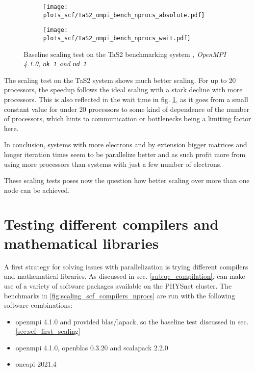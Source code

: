 \documentclass[main.tex]{subfiles}
\begin{document}
\begin{figure}[ht!]
\begin{subfigure}[b]{0.49\textwidth}
    \centering
    \texttt{[image: plots\_scf/TaS2\_ompi\_bench\_nprocs\_absolute.pdf]}
\end{subfigure}
\begin{subfigure}[b]{0.49\textwidth}
    \centering
    \texttt{[image: plots\_scf/TaS2\_ompi\_bench\_nprocs\_wait.pdf]}
\end{subfigure}
\caption{Baseline scaling test on the TaS2 benchmarking system \emph{, OpenMPI 4.1.0, \texttt{nk 1} and \texttt{nd 1}}}
\label{fig:scaling_scf_ompi_nprocs_tas2_absolute_wait}
\end{figure}
The scaling test on the TaS2 system shows much better scaling.
For up to 20 processors, the speedup follows the ideal scaling with a stark decline with more processors.
This is also reflected in the wait time in fig. \ref{fig:scaling_scf_ompi_nprocs_tas2_absolute_wait}, as it goes from a small constant value for under 20 processors to some kind of dependence of the number of processors, which hints to communication or bottlenecks being a limiting factor here.

In conclusion, systems with more electrons and by extension bigger matrices and longer iteration times seem to be parallelize better and as such profit more from using more processors than systems with just a few number of electrons.

These scaling tests poses now the question how better scaling over more than one node can be achieved.

\section{Testing different compilers and mathematical libraries}

A first strategy for solving issues with parallelization is trying different compilers and mathematical libraries.
As discussed in sec. \ref{sub:qe_compilation}, \QE can make use of a variety of software packages available on the PHYSnet cluster.
The benchmarks in \ref{fig:scaling_scf_compilers_nprocs} are run with the following software combinations:
\begin{itemize}
    \item \gls{openmpi} 4.1.0 and \QE provided \gls{blas}/\gls{lapack}, so the baseline test discussed in sec. \ref{sec:scf_first_scaling}
    \item \gls{openmpi} 4.1.0, \gls{openblas} 0.3.20 and \gls{scalapack} 2.2.0
    \item \gls{oneapi} 2021.4
\end{itemize}
\end{document}
